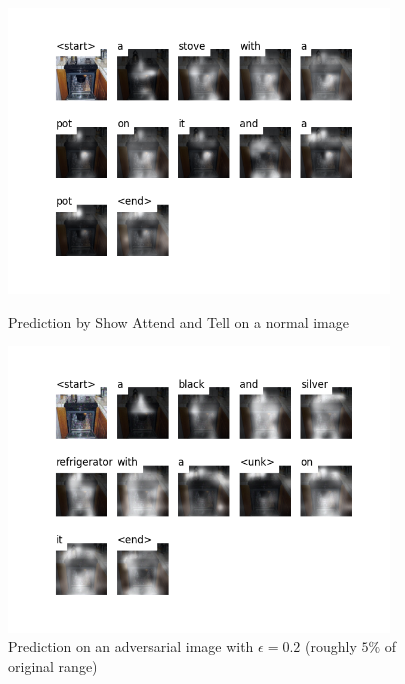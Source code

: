 \begin{figure}[ht]
    \centering
    \begin{minipage}{0.45\textwidth}
        \centering
        \includegraphics[width=0.9\textwidth]{figures/caption_kitchen_normal.png} %
        \caption{Prediction by Show Attend and Tell on a normal image}
    \end{minipage}\hfill
    \begin{minipage}{0.45\textwidth}
        \centering
        \includegraphics[width=0.9\textwidth]{figures/caption_kitchen_adversarial.png} %
        \caption{Prediction on an adversarial image with $\epsilon=0.2$ (roughly $5\%$ of original range)}
    \end{minipage}
\end{figure}

